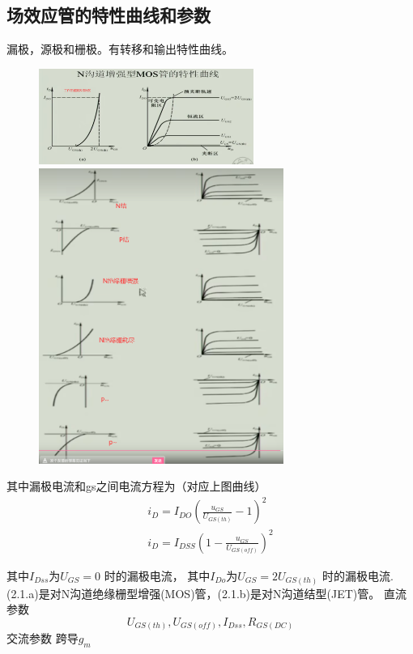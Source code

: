 \subsection{场效应管的特性曲线和参数}
漏极，源极和栅极。有转移和输出特性曲线。
\begin{figure}[H]
    \centering
    \includegraphics[width=7cm]{img/1.9.1.png}
    \includegraphics[width=8cm]{img/1.9.2.png}

    \end{figure}
其中漏极电流和gs之间电流方程为（对应上图曲线）
\begin{align}
    i_{D}=I_{DO}(\frac{u_{GS}}{U_{GS(th)}}-1)^{2} \tag{2.1.a} \\
    i_{D}=I_{DSS}(1-\frac{u_{GS}}{U_{GS(off)}})^{2} \tag{2.1.b}
\end{align}

其中$I_{Dss}$为$U_{GS}=0$ 时的漏极电流，
其中$I_{Do}$为$U_{GS}=2U_{GS(th)}$ 时的漏极电流.(2.1.a)是对N沟道绝缘栅型增强(MOS)管，(2.1.b)是对N沟道结型(JET)管。
{直流参数}
$$
U_{GS(th)},U_{GS(off)},I_{Dss},R_{GS(DC)}
$$
{交流参数}
跨导$g_m$